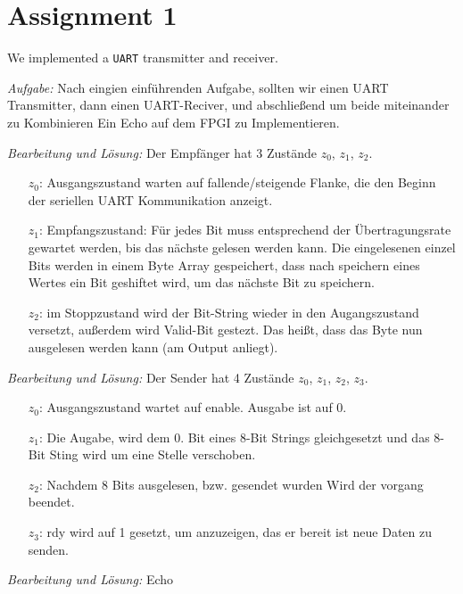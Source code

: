 \section*{Assignment 1}
We implemented a \texttt{UART} transmitter and receiver.

\emph{Aufgabe: }Nach eingien einführenden Aufgabe, sollten wir einen UART Transmitter, dann einen UART-Reciver, und abschließend um beide miteinander zu Kombinieren Ein Echo auf dem FPGI zu Implementieren.


\emph{Bearbeitung und Lösung: }Der Empfänger hat 3 Zustände $z_0$, $z_1$, $z_2$.\begin{itemize}


\item[$z_0$:] Ausgangszustand warten auf fallende/steigende Flanke, die den Beginn der seriellen UART Kommunikation anzeigt.
\item[$z_1$:] Empfangszustand: Für jedes Bit muss entsprechend der Übertragungsrate gewartet werden, bis das nächste gelesen werden kann. Die eingelesenen einzel Bits werden in einem Byte Array gespeichert, dass nach speichern eines Wertes ein Bit geshiftet wird, um das nächste Bit zu speichern. 
\item[$z_2$:] im Stoppzustand wird der Bit-String wieder in den Augangszustand versetzt, außerdem wird Valid-Bit gestezt. Das heißt, dass das Byte nun ausgelesen werden kann (am Output anliegt). 
\end{itemize}

\emph{Bearbeitung und Lösung: }Der Sender hat 4 Zustände $z_0$, $z_1$, $z_2$, $z_3$.\begin{itemize}


\item[$z_0$:] Ausgangszustand wartet auf enable. Ausgabe ist auf 0.
\item[$z_1$:] Die Augabe, wird dem 0. Bit eines 8-Bit Strings gleichgesetzt und das 8-Bit Sting wird um eine Stelle verschoben.
\item[$z_2$:] Nachdem 8 Bits ausgelesen, bzw. gesendet wurden Wird der vorgang beendet.
\item[$z_3$:] rdy wird auf 1 gesetzt, um anzuzeigen, das er bereit ist neue Daten zu senden.  

\end{itemize}

\emph{Bearbeitung und Lösung: } Echo 